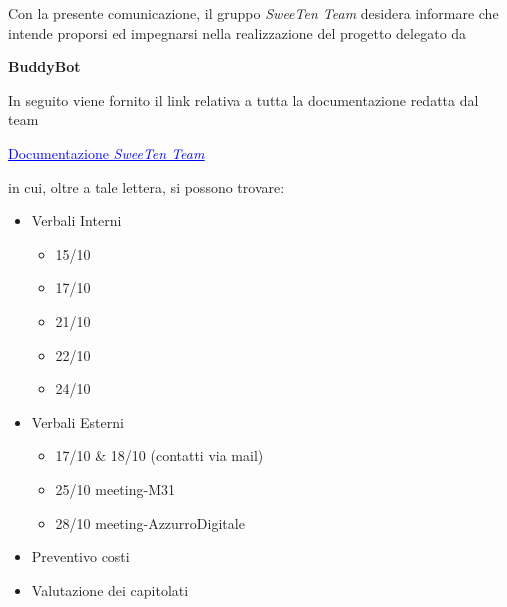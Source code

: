 \documentclass[italian, 12pt]{article}
\begin{document}
\pagestyle{mystyle}


\newpage

Con la presente comunicazione, il gruppo \textit{SweeTen Team} desidera informare che intende proporsi ed impegnarsi nella realizzazione del progetto delegato da \hspace{0.1em} 
\begin{center}
  \textbf{BuddyBot}
\end{center}
In seguito viene fornito il link relativa a tutta la documentazione redatta dal team
\begin{center}
  \href{https://github.com/SweeTenTeam/Docs}{\textcolor{blue}{\underline{Documentazione \textit{SweeTen Team}}}}
\end{center}
in cui, oltre a tale lettera, si possono trovare:
\begin{itemize}
    \item Verbali Interni
    \begin{multicols}{2} %
    \begin{itemize}
        \item 15/10
        \item 17/10
        \item 21/10
        \item 22/10
        \item 24/10
    \end{itemize}
    \end{multicols}
    \item Verbali Esterni
    \begin{itemize}
        \item 17/10 \& 18/10 (contatti via mail)
        \item 25/10 meeting-M31
        \item 28/10 meeting-AzzurroDigitale
    \end{itemize}
    \item Preventivo costi
    \item Valutazione dei capitolati
\end{itemize}
\end{document}
